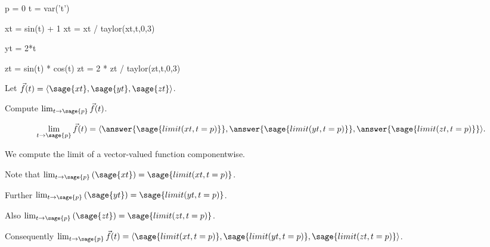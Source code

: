 \documentclass{ximera}
\author{Jim Fowler}
\begin{document}
\makerandom

\begin{sagesilent}
  p = 0
  t = var('t')
  
  xt = sin(t) + 1
  xt = xt / taylor(xt,t,0,3)
  
  yt = 2*t
  
  zt = sin(t) * cos(t)
  zt = 2 * zt / taylor(zt,t,0,3)
\end{sagesilent}

\begin{exercise}

  Let $\vec{f}(t) = \langle \sage{xt}, \sage{yt}, \sage{zt} \rangle$.

  Compute $\lim_{t \to \sage{p}} \vec{f}(t)$.

  \begin{prompt}
    \[
      \lim_{t \to \sage{p}} \vec{f}(t) = \langle \answer{\sage{limit(xt,t=p)}}, \answer{\sage{limit(yt,t=p)}}, \answer{\sage{limit(zt,t=p)}} \rangle.
    \]
  \end{prompt}
  
  \begin{hint}
    We compute the limit of a vector-valued function componentwise.
  \end{hint}

  \begin{hint}
    Note that $\lim_{t \to \sage{p}} \left( \sage{xt} \right) = \sage{limit(xt,t=p)}$.
  \end{hint}

  \begin{hint}
    Further $\lim_{t \to \sage{p}} \left( \sage{yt} \right) = \sage{limit(yt,t=p)}$.
  \end{hint}

  \begin{hint}
    Also $\lim_{t \to \sage{p}} \left( \sage{zt} \right) = \sage{limit(zt,t=p)}$.
  \end{hint}
  
  \begin{hint}
    Consequently $\lim_{t \to \sage{p}} \vec{f}(t) = \langle \sage{limit(xt,t=p)}, \sage{limit(yt,t=p)}, \sage{limit(zt,t=p)} \rangle$.
  \end{hint}          
  
\end{exercise}
\end{document}
